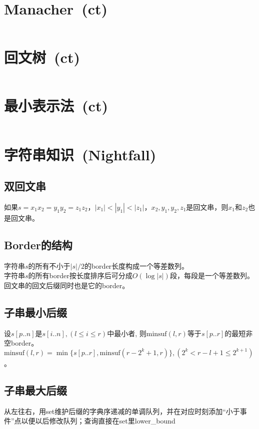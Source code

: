 \section{Manacher\ \small(ct)}
	\inputminted{cpp}{string/manacher.cpp}
\section{回文树\ \small(ct)}
	\inputminted{cpp}{string/palindromic_tree.cpp}
\section{最小表示法\ \small(ct)}
	\inputminted{cpp}{string/minimal_rounding_string.cpp}
\section{字符串知识\ \small(Nightfall)}
	\subsection*{双回文串}
		如果$ s = x_1 x_2 = y_1 y_2 = z_1 z_2 $，$ \left|x_1\right| < \left|y_1\right| < \left|z_1\right| $，$ x_2, y_1, y_2, z_1 $是回文串，则$ x_1 $和$ z_2 $也是回文串。
	\subsection*{Border的结构}
		字符串$ s $的所有不小于$ \left|s\right| / 2 $的border长度构成一个等差数列。
		\\字符串$ s $的所有border按长度排序后可分成$ O(\log \left| s \right|) $段，每段是一个等差数列。
		\\回文串的回文后缀同时也是它的border。
	\subsection*{子串最小后缀}
		设$ s[p..n] $是$ s[i..n], (l \leq i \leq r) $中最小者, 则$ \text{minsuf}(l, r) $等于$ s[p..r] $的最短非空border。$ \text{minsuf}(l, r) = \min \lbrace s[p..r], \text{minsuf}(r - 2^k + 1, r) \rbrace, (2^k < r - l + 1 \leq 2^{k + 1} ) $。
	\subsection*{子串最大后缀}
		从左往右，用set维护后缀的字典序递减的单调队列，并在对应时刻添加“小于事件”点以便以后修改队列；查询直接在set里lower\_bound
